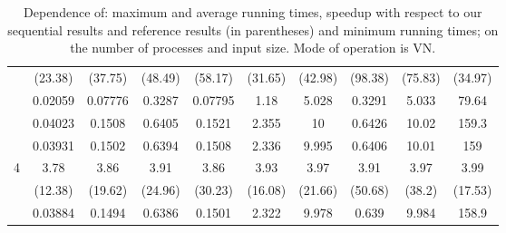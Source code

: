 \begin{table}[h]
\begin{tabular}{c|c|c|c|c|c|c|c|c|c|}
 & (23.38) & (37.75) & (48.49) & (58.17) & (31.65) & (42.98) & (98.38) & (75.83) & (34.97) \\
 & 0.02059 & 0.07776 & 0.3287 & 0.07795 & 1.18 & 5.028 & 0.3291 & 5.033 & 79.64 \\
\hline
 & 0.04023 & 0.1508 & 0.6405 & 0.1521 & 2.355 & 10 & 0.6426 & 10.02 & 159.3 \\
 & 0.03931 & 0.1502 & 0.6394 & 0.1508 & 2.336 & 9.995 & 0.6406 & 10.01 & 159 \\
4 & 3.78 & 3.86 & 3.91 & 3.86 & 3.93 & 3.97 & 3.91 & 3.97 & 3.99 \\
 & (12.38) & (19.62) & (24.96) & (30.23) & (16.08) & (21.66) & (50.68) & (38.2) & (17.53) \\
 & 0.03884 & 0.1494 & 0.6386 & 0.1501 & 2.322 & 9.978 & 0.639 & 9.984 & 158.9 \\
\hline
\end{tabular}
\caption{Dependence of: maximum and average running times, speedup with respect to our sequential results and reference results (in parentheses) and minimum running times; on the number of processes and input size. Mode of operation is VN.}
\end{table}

